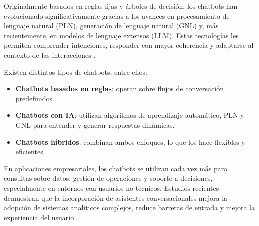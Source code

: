 Originalmente basados en reglas fijas y árboles de decisión, los chatbots han evolucionado significativamente gracias a los avances en procesamiento de lenguaje natural (PLN), generación de lenguaje natural (GNL) y, más recientemente, en modelos de lenguaje extensos (LLM). Estas tecnologías les permiten comprender intenciones, responder con mayor coherencia y adaptarse al contexto de las interacciones \parencite{shum2018}.

Existen distintos tipos de chatbots, entre ellos:

\begin{itemize}
    \item \textbf{Chatbots basados en reglas}: operan sobre flujos de conversación predefinidos.
    
    \item \textbf{Chatbots con IA}: utilizan algoritmos de aprendizaje automático, PLN y GNL para entender y generar respuestas dinámicas.
    
    \item \textbf{Chatbots híbridos}: combinan ambos enfoques, lo que los hace flexibles y eficientes.
\end{itemize}

En aplicaciones empresariales, los chatbots se utilizan cada vez más para consultas sobre datos, gestión de operaciones y soporte a decisiones, especialmente en entornos con usuarios no técnicos. Estudios recientes demuestran que la incorporación de asistentes conversacionales mejora la adopción de sistemas analíticos complejos, reduce barreras de entrada y mejora la experiencia del usuario \parencite{knote2021}.

